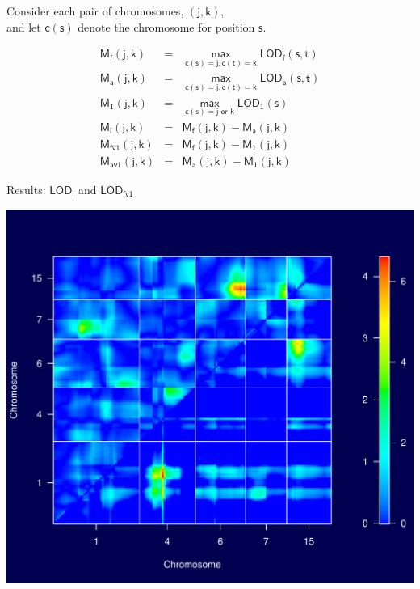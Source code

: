 \documentclass[12pt]{article}
\newcommand{\headsize}{\fontsize{35}{35} \selectfont}
\newcommand{\lod}{\text{LOD}}
\newcommand{\M}{\text{M}}
\begin{document}
\hfill \begin{minipage}[t]{10in}
Consider each pair of chromosomes, {\color{myblue} $\mathsf{(j, k)}$}, \\
and let {\color{myblue} $\mathsf{c(s)}$} denote the chromosome for
  position {\color{myblue} $\mathsf{s}$}.

\vspace{5mm}

\hspace{1in}
\begin{minipage}{6in}
{\color{myblue}
\begin{eqnarray*}
\mathsf{\M_f(j,k)}& = &\mathsf{ \max_{c(s)=j, c(t)=k} \lod_f(s,t)} \\[12pt]
\mathsf{\M_a(j,k)}& = &\mathsf{ \max_{c(s)=j, c(t)=k} \lod_a(s,t)} \\[12pt]
\mathsf{\M_1(j,k)}& = &\mathsf{ \max_{c(s)=j \text{ or } k} \lod_1(s)} \\[36pt]
\mathsf{\M_i(j,k)}& = &\mathsf{ \M_f(j,k) - \M_a(j,k)}\\[12pt]
\mathsf{\M_{fv1}(j,k)}& = &\mathsf{ \M_f(j,k) - \M_1(j,k)}\\[12pt]
\mathsf{\M_{av1}(j,k)}& = &\mathsf{ \M_a(j,k) - \M_1(j,k)}
\end{eqnarray*}
}
\end{minipage}
\end{minipage}

\newpage

\headsize \color{myyellow}
\hfill \begin{minipage}{5.75in}
\centering
Results: $\mathsf{\lod_i}$ and $\mathsf{\lod_{fv1}}$
\end{minipage}

\vfill

\centerline{\includegraphics{FigsB/2dscan_selchr_fv1.pdf}}
\end{document}
